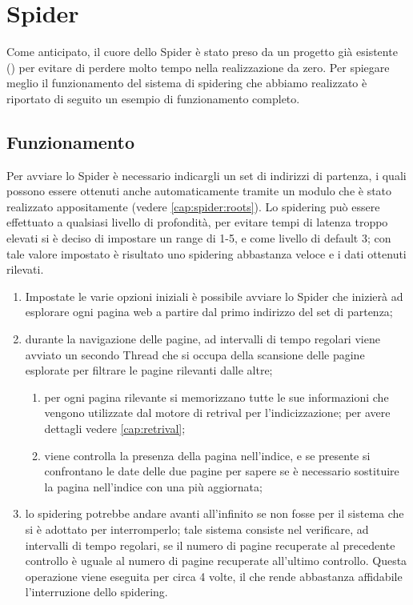 \chapter{Spider}\label{cap:spider}
Come anticipato, il cuore dello Spider è stato preso da un progetto già esistente () per evitare di perdere molto tempo nella realizzazione da zero. Per spiegare meglio il funzionamento del sistema di spidering che abbiamo realizzato è riportato di seguito un esempio di funzionamento completo.
\section{Funzionamento}
Per avviare lo Spider è necessario indicargli un set di indirizzi di partenza, i quali possono essere ottenuti anche automaticamente tramite un modulo che è stato realizzato appositamente (vedere \ref{cap:spider:roots}). Lo spidering può essere effettuato a qualsiasi livello di profondità, per evitare tempi di latenza troppo elevati si è deciso di impostare un range di 1-5, e come livello di default 3; con tale valore impostato è risultato uno spidering abbastanza veloce e i dati ottenuti rilevati.
\begin{enumerate}
\item Impostate le varie opzioni iniziali è possibile avviare lo Spider che inizierà ad esplorare ogni pagina web a partire dal primo indirizzo del set di partenza;
\item durante la navigazione delle pagine, ad intervalli di tempo regolari viene avviato un secondo Thread che si occupa della scansione delle pagine esplorate per filtrare le pagine rilevanti dalle altre;
	\begin{enumerate}
	\item per ogni pagina rilevante si memorizzano tutte le sue informazioni che vengono utilizzate dal motore di retrival per l'indicizzazione; per avere dettagli vedere \ref{cap:retrival};
	\item viene controlla la presenza della pagina nell'indice, e se presente si confrontano le date delle due pagine per sapere se è necessario sostituire la pagina nell'indice con una più aggiornata;
	\end{enumerate}
\item lo spidering potrebbe andare avanti all'infinito se non fosse per il sistema che si è adottato per interromperlo; tale sistema consiste nel verificare, ad intervalli di tempo regolari, se il numero di pagine recuperate al precedente controllo è uguale al numero di pagine recuperate all'ultimo controllo. Questa operazione viene eseguita per circa 4 volte, il che rende abbastanza affidabile l'interruzione dello spidering.
\end{enumerate}
